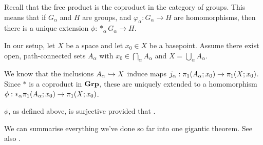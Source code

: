 Recall that the free product is the coproduct in the category of groups. This means that if $G_{\alpha}$ and $H$ are groups, and $\varphi_{\alpha} : G_{\alpha} \to H$ are homomorphisms, then there is a unique extension $\phi : \ast_{\alpha} G_{\alpha} \to H$.

In our setup, let $X$ be a space and let $x_0 \in X$ be a basepoint. Assume there exist open, path-connected sets $A_{\alpha}$ with $x_0 \in \bigcap_{\alpha} A_{\alpha}$ and $X = \bigcup_{\alpha} A_{\alpha}$.

We know that the inclusions $A_{\alpha} \hookrightarrow X$ induce maps $j_{\alpha} : \pi_1\!\left( A_{\alpha}; x_0 \right) \to \pi_1\!\left( X; x_0 \right)$. Since $*$ is a coproduct in $\mathbf{Grp}$, these are uniquely extended to a homomorphism $\phi : \ast_{\alpha} \pi_1\!\left( A_{\alpha}; x_0 \right) \to \pi_1\!\left( X; x_0 \right)$.

\begin{boxlemma}\label{Ch1:Lemma:VanKampen_Surjective}
    $\phi$, as defined above, is surjective provided that \sorry.
\end{boxlemma}

We can summarise everything we've done so far into one gigantic theorem. See also \cite[Chapitre 5, Théorème 1.2]{EPFLTopologie}.

